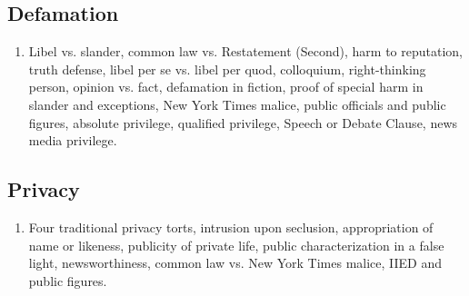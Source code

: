 \subsection{Defamation}

\begin{enumerate}
    \item Libel vs. slander, common law vs. Restatement (Second), harm to reputation, truth
    defense, libel per se vs. libel per quod, colloquium, right-thinking 
    person, opinion vs. fact, defamation in fiction, proof of special harm in 
    slander and exceptions, New York Times malice, public officials and public 
    figures, absolute privilege, qualified privilege, Speech or Debate Clause, 
    news media privilege.
\end{enumerate}

\subsection{Privacy}

\begin{enumerate}
    \item Four traditional privacy torts, intrusion upon seclusion, 
    appropriation of name or likeness, publicity of private life, public 
    characterization in a false light, newsworthiness, common law vs. New York 
    Times malice, IIED and public figures.
\end{enumerate}
